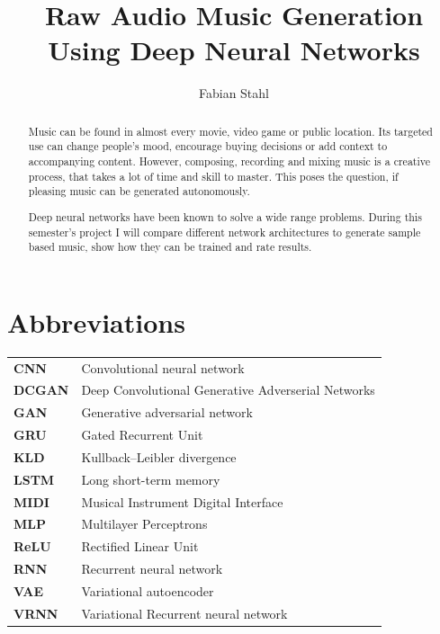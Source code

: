 \documentclass[12pt]{article}
\begin{document}
\setlength\parindent{0pt}
\title{Raw Audio Music Generation Using Deep Neural Networks}
\author{Fabian Stahl}


\maketitle

\tableofcontents

\newpage
\section*{Abbreviations}
\begin{center}
\begin{tabular}{l l}
\textbf{CNN} & Convolutional neural network \\
\textbf{DCGAN} & Deep Convolutional Generative Adverserial Networks\\
\textbf{GAN} & Generative adversarial network \\
\textbf{GRU} & Gated Recurrent Unit \\
\textbf{KLD}  & Kullback–Leibler divergence\\
\textbf{LSTM} & Long short-term memory \\
\textbf{MIDI} & Musical Instrument Digital Interface \\
\textbf{MLP} & Multilayer Perceptrons \\
\textbf{ReLU} & Rectified Linear Unit \\
\textbf{RNN} & Recurrent neural network \\
\textbf{VAE} & Variational autoencoder \\
\textbf{VRNN} & Variational Recurrent neural network \\
\end{tabular}
\end{center}
\newpage


\begin{abstract}
Music can be found in almost every movie, video game or public location.
Its targeted use can change people's mood, encourage buying decisions or add context to accompanying content.
However, composing, recording and mixing music is a creative process, that takes a lot of time and skill to master.
This poses the question, if pleasing music can be generated autonomously.

Deep neural networks have been known to solve a wide range problems.
During this semester's project I will compare different network architectures to generate sample based music, show how they can be trained and rate results.
\end{abstract}
\end{document}
